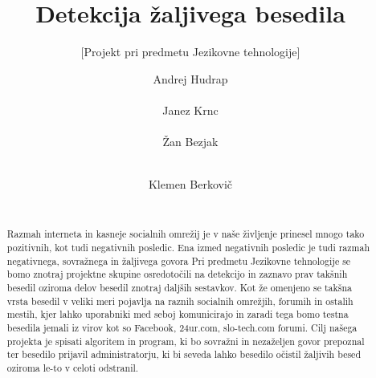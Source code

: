 \documentclass{acm_proc_article-sp}
\begin{document}
\title{Detekcija žaljivega besedila}
\subtitle{[Projekt pri predmetu Jezikovne tehnologije]}


\author{
\alignauthor Andrej Hudrap\\
       \\
\alignauthor Janez Krnc\\
       \\
\alignauthor Žan Bezjak\\
       \\
\and
\alignauthor Klemen Berkovič\\
       \\
}
\maketitle

\begin{abstract}
Razmah interneta in kasneje socialnih omrežij je v naše življenje prinesel mnogo tako pozitivnih, kot tudi negativnih posledic.
Ena izmed negativnih posledic je tudi razmah negativnega, sovražnega in žaljivega govora
Pri predmetu Jezikovne tehnologije se bomo znotraj projektne skupine osredotočili na detekcijo in zaznavo prav takšnih besedil oziroma delov besedil znotraj daljših sestavkov.
Kot že omenjeno se takšna vrsta besedil v veliki meri pojavlja na raznih socialnih omrežjih, forumih in ostalih mestih, kjer lahko uporabniki med seboj komunicirajo in zaradi tega bomo testna besedila jemali iz virov kot so Facebook, 24ur.com, slo-tech.com forumi.
Cilj našega projekta je spisati algoritem in program, ki bo sovražni in nezaželjen govor prepoznal ter besedilo prijavil administratorju, ki bi seveda lahko besedilo očistil žaljivih besed oziroma le-to v celoti odstranil.
\end{abstract}
\end{document}
